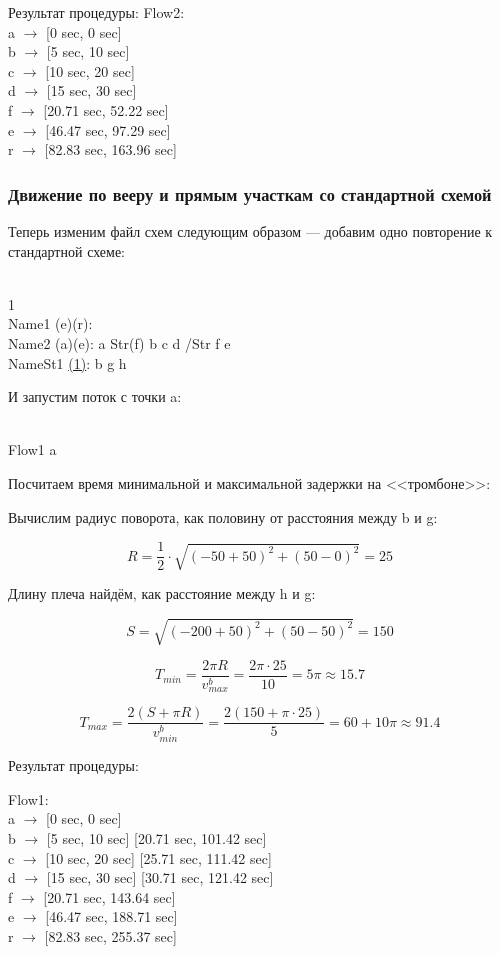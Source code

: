\documentclass[12pt, a4 paper]{article}
\begin{document}
Результат процедуры:
Flow2:\\
a $\rightarrow$ [0 sec, 0 sec]\\
b $\rightarrow$ [5 sec, 10 sec]\\
c $\rightarrow$ [10 sec, 20 sec]\\
d $\rightarrow$ [15 sec, 30 sec]\\
f $\rightarrow$ [20.71 sec, 52.22 sec]\\
e $\rightarrow$ [46.47 sec, 97.29 sec]\\
r $\rightarrow$ [82.83 sec, 163.96 sec]\\



\subsubsection{Движение по вееру и прямым участкам со стандартной схемой}

Теперь изменим файл схем следующим образом --- добавим одно повторение к стандартной схеме:

\\
1\\
Name1 (e)(r):\\
Name2 (a)(e): a Str(f) b c d /Str f e\\
NameSt1 \underline{(1)}: b g h

И запустим поток с точки a:

\\
Flow1 a

Посчитаем время минимальной и максимальной задержки на <<тромбоне>>:

Вычислим радиус поворота, как половину от расстояния между b и g:

$$
 R = \frac{1}{2} \cdot \sqrt{(-50 + 50)^2 + (50 - 0)^2} = 25
$$

Длину плеча найдём, как расстояние между h и g:

$$
S = \sqrt{(-200 + 50)^2 + (50 - 50)^2} = 150
$$

$$
T_{min} = \frac{2 \pi R}{v_{max}^b} = \frac{2 \pi \cdot 25}{10} = 5\pi \approx 15.7
$$

$$
T_{max} = \frac{2(S + \pi R)}{v_{min}^b} = \frac{2(150 + \pi \cdot 25)}{5} = 60 + 10\pi \approx 91.4
$$

Результат процедуры:

\noindent Flow1:\\
a $\rightarrow$ [0 sec, 0 sec]\\
b $\rightarrow$ [5 sec, 10 sec] [20.71 sec, 101.42 sec]\\
c $\rightarrow$ [10 sec, 20 sec] [25.71 sec, 111.42 sec]\\
d $\rightarrow$ [15 sec, 30 sec] [30.71 sec, 121.42 sec]\\
f $\rightarrow$ [20.71 sec, 143.64 sec]\\
e $\rightarrow$ [46.47 sec, 188.71 sec]\\
r $\rightarrow$ [82.83 sec, 255.37 sec]\\
\end{document}
